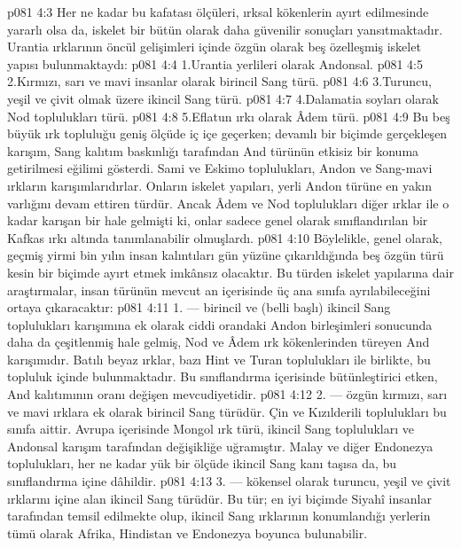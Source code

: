 \vs p081 4:3 Her ne kadar bu kafatası ölçüleri, ırksal kökenlerin ayırt edilmesinde yararlı olsa da, iskelet bir bütün olarak daha güvenilir sonuçları yansıtmaktadır. Urantia ırklarının öncül gelişimleri içinde özgün olarak beş özelleşmiş iskelet yapısı bulunmaktaydı:
\vs p081 4:4 1.\bibnobreakspace Urantia yerlileri olarak Andonsal.
\vs p081 4:5 2.\bibnobreakspace Kırmızı, sarı ve mavi insanlar olarak birincil Sang türü.
\vs p081 4:6 3.\bibnobreakspace Turuncu, yeşil ve çivit olmak üzere ikincil Sang türü.
\vs p081 4:7 4.\bibnobreakspace Dalamatia soyları olarak Nod toplulukları türü.
\vs p081 4:8 5.\bibnobreakspace Eflatun ırkı olarak Âdem türü.
\vs p081 4:9 Bu beş büyük ırk topluluğu geniş ölçüde iç içe geçerken; devamlı bir biçimde gerçekleşen karışım, Sang kalıtım baskınlığı tarafından And türünün etkisiz bir konuma getirilmesi eğilimi gösterdi. Sami ve Eskimo toplulukları, Andon ve Sang\hyp{}mavi ırkların karışımlarıdırlar. Onların iskelet yapıları, yerli Andon türüne en yakın varlığını devam ettiren türdür. Ancak Âdem ve Nod toplulukları diğer ırklar ile o kadar karışan bir hale gelmişti ki, onlar sadece genel olarak sınıflandırılan bir Kafkas ırkı altında tanımlanabilir olmuşlardı.
\vs p081 4:10 Böylelikle, genel olarak, geçmiş yirmi bin yılın insan kalıntıları gün yüzüne çıkarıldığında beş özgün türü kesin bir biçimde ayırt etmek imkânsız olacaktır. Bu türden iskelet yapılarına dair araştırmalar, insan türünün mevcut an içerisinde üç ana sınıfa ayrılabileceğini ortaya çıkaracaktır:
\vs p081 4:11 1.\bibnobreakspace {} --- birincil ve (belli başlı) ikincil Sang toplulukları karışımına ek olarak ciddi orandaki Andon birleşimleri sonucunda daha da çeşitlenmiş hale gelmiş, Nod ve Âdem ırk kökenlerinden türeyen And karışımıdır. Batılı beyaz ırklar, bazı Hint ve Turan toplulukları ile birlikte, bu topluluk içinde bulunmaktadır. Bu sınıflandırma içerisinde bütünleştirici etken, And kalıtımının oranı değişen mevcudiyetidir.
\vs p081 4:12 2.\bibnobreakspace {} --- özgün kırmızı, sarı ve mavi ırklara ek olarak birincil Sang türüdür. Çin ve Kızılderili toplulukları bu sınıfa aittir. Avrupa içerisinde Mongol ırk türü, ikincil Sang toplulukları ve Andonsal karışım tarafından değişikliğe uğramıştır. Malay ve diğer Endonezya toplulukları, her ne kadar yük bir ölçüde ikincil Sang kanı taşısa da, bu sınıflandırma içine dâhildir.
\vs p081 4:13 3.\bibnobreakspace {} --- kökensel olarak turuncu, yeşil ve çivit ırklarını içine alan ikincil Sang türüdür. Bu tür; en iyi biçimde Siyahî insanlar tarafından temsil edilmekte olup, ikincil Sang ırklarının konumlandığı yerlerin tümü olarak Afrika, Hindistan ve Endonezya boyunca bulunabilir.
